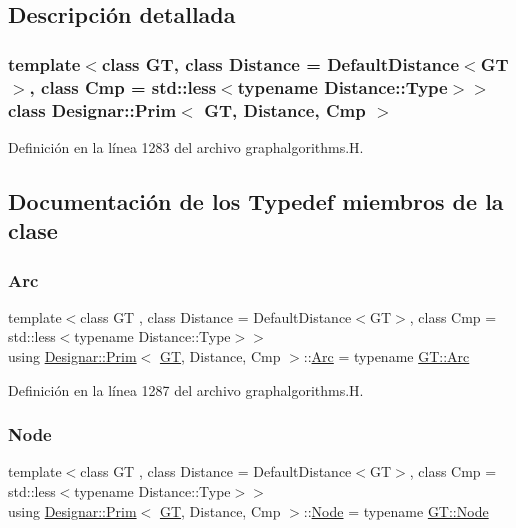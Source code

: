 \subsection{Descripción detallada}
\subsubsection*{template$<$class GT, class Distance = Default\+Distance$<$\+G\+T$>$, class Cmp = std\+::less$<$typename Distance\+::\+Type$>$$>$\newline
class Designar\+::\+Prim$<$ G\+T, Distance, Cmp $>$}



Definición en la línea 1283 del archivo graphalgorithms.\+H.



\subsection{Documentación de los \textquotesingle{}Typedef\textquotesingle{} miembros de la clase}
\mbox{\label{class_designar_1_1_prim_adb1cb5cb91efc05d2a06b5e0825ed609}} 
\subsubsection{\texorpdfstring{Arc}{Arc}}
{\footnotesize\ttfamily template$<$class GT , class Distance  = Default\+Distance$<$\+G\+T$>$, class Cmp  = std\+::less$<$typename Distance\+::\+Type$>$$>$ \\
using \hyperlink{class_designar_1_1_prim}{Designar\+::\+Prim}$<$ \hyperlink{demo-buildgraph_8_c_a3001c40d2c31ca87ed96cd7d1334a55e}{GT}, Distance, Cmp $>$\+::\hyperlink{class_designar_1_1_prim_adb1cb5cb91efc05d2a06b5e0825ed609}{Arc} =  typename \hyperlink{class_designar_1_1_graph_a74c730ef4ce2d20f998d72bd25c2b5bf}{G\+T\+::\+Arc}}



Definición en la línea 1287 del archivo graphalgorithms.\+H.

\mbox{\label{class_designar_1_1_prim_a61fb55303a5350e0a6dadd5472571ba6}} 
\subsubsection{\texorpdfstring{Node}{Node}}
{\footnotesize\ttfamily template$<$class GT , class Distance  = Default\+Distance$<$\+G\+T$>$, class Cmp  = std\+::less$<$typename Distance\+::\+Type$>$$>$ \\
using \hyperlink{class_designar_1_1_prim}{Designar\+::\+Prim}$<$ \hyperlink{demo-buildgraph_8_c_a3001c40d2c31ca87ed96cd7d1334a55e}{GT}, Distance, Cmp $>$\+::\hyperlink{class_designar_1_1_prim_a61fb55303a5350e0a6dadd5472571ba6}{Node} =  typename \hyperlink{class_designar_1_1_graph_a5dfc7dba9d092ac489c72e40390c37d0}{G\+T\+::\+Node}}



